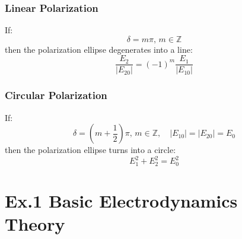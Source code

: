 \documentclass[11pt,a4paper,oneside]{book}
\begin{document}
\subsection{Linear Polarization}
If:\begin{equation}
	\delta=m\pi,\,m\in \mathbb{Z}
\end{equation}
then the polarization ellipse degenerates into a line:\begin{equation}
	\dfrac{E_2}{|E_{20}|}=(-1)^m\dfrac{E_1}{|E_{10}|}
\end{equation}

\subsection{Circular Polarization}
If:\begin{equation}
	\delta=\left(m+\frac{1}{2}\right)\pi,\,m\in \mathbb{Z},\quad |E_{10}|=|E_{20}|=E_0
\end{equation}
then the polarization ellipse turns into a circle:\begin{equation}
	E_1^2+E_2^2=E_0^2
\end{equation}
















\newpage
\appendix
\chapter{Ex.1 Basic Electrodynamics Theory}
\end{document}
